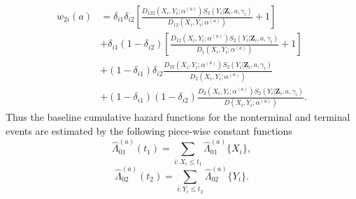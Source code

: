 \documentclass[12pt]{article}
\def\bfZ{\mathbf{Z}}
\begin{document}
\begin{equation*}
\begin{split}
w_{2i}(a) &= \delta_{i1}\delta_{i2}\left[ \frac{D_{122}(X_i,Y_i;\alpha^{(a)})S_2(Y_i|\bfZ_i,a,\gamma_i)}{D_{12}(X_i,Y_i;\alpha^{(a)})}+1\right]\\
&+\delta_{i1}(1-\delta_{i2})\left[\frac{D_{12}(X_i,Y_i;\alpha^{(a)})S_2(Y_i|\bfZ_i,a,\gamma_i)}{D_{1}(X_i,Y_i;\alpha^{(a)})}+1 \right]\\
&+(1-\delta_{i1})\delta_{i2}\frac{D_{22}(X_i,Y_i;\alpha^{(a)})S_2(Y_i|\bfZ_i,a,\gamma_i)}{D_{2}(X_i,Y_i;\alpha^{(a)})}\\
&+(1-\delta_{i1})(1-\delta_{i2})\frac{D_{2}(X_i,Y_i;\alpha^{(a)})S_2(Y_i|\bfZ_i,a,\gamma_i)}{D(X_i,Y_i;\alpha^{(a)})}.
\end{split}
\end{equation*}
Thus the baseline cumulative hazard functions for the nonterminal and terminal events are estimated by the following piece-wise constant functions
\begin{equation}
\widehat{\Lambda}_{01}^{(a)}(t_1)= \sum\limits_{i: X_i\leq t_1} \widehat{\Lambda}_{01}^{(a)}\{X_i\},
\end{equation}
\begin{equation}
\widehat{\Lambda}_{02}^{(a)}(t_2)= \sum\limits_{i: Y_i\leq t_2} \widehat{\Lambda}_{02}^{(a)}\{Y_i\}.
\end{equation}
\end{document}
